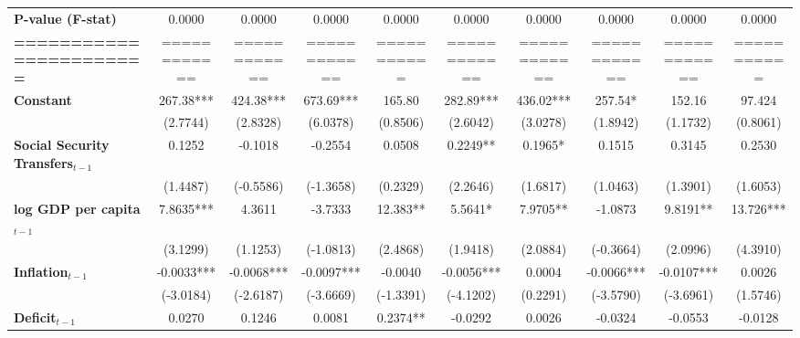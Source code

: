 \begin{center}
\begin{tabular}{lccccccccc}
\textbf{P-value (F-stat)}          &     0.0000     &      0.0000      &      0.0000      &      0.0000      &      0.0000      &      0.0000      &      0.0000      &      0.0000      &      0.0000       \\
\textbf{=======================}   &  ============  &   ============   &   ============   &   ===========    &   ============   &   ============   &   ============   &   ============   &   ===========     \\
\textbf{Constant}                     &   267.38***    &    424.38***     &    673.69***     &      165.80      &    282.89***     &    436.02***     &     257.54*      &      152.16      &      97.424       \\
\textbf{ }                         &    (2.7744)    &     (2.8328)     &     (6.0378)     &     (0.8506)     &     (2.6042)     &     (3.0278)     &     (1.8942)     &     (1.1732)     &     (0.8061)      \\
\textbf{Social Security Transfers$_{t-1}$}              &     0.1252     &     -0.1018      &     -0.2554      &      0.0508      &     0.2249**     &     0.1965*      &      0.1515      &      0.3145      &      0.2530       \\
\textbf{ }                         &    (1.4487)    &    (-0.5586)     &    (-1.3658)     &     (0.2329)     &     (2.2646)     &     (1.6817)     &     (1.0463)     &     (1.3901)     &     (1.6053)      \\
\textbf{log GDP per capita$_{t-1}$}           &   7.8635***    &      4.3611      &     -3.7333      &     12.383**     &     5.5641*      &     7.9705**     &     -1.0873      &     9.8191**     &    13.726***      \\
\textbf{ }                         &    (3.1299)    &     (1.1253)     &    (-1.0813)     &     (2.4868)     &     (1.9418)     &     (2.0884)     &    (-0.3664)     &     (2.0996)     &     (4.3910)      \\
\textbf{Inflation$_{t-1}$}      &   -0.0033***   &    -0.0068***    &    -0.0097***    &     -0.0040      &    -0.0056***    &      0.0004      &    -0.0066***    &    -0.0107***    &      0.0026       \\
\textbf{ }                         &   (-3.0184)    &    (-2.6187)     &    (-3.6669)     &    (-1.3391)     &    (-4.1202)     &     (0.2291)     &    (-3.5790)     &    (-3.6961)     &     (1.5746)      \\
\textbf{Deficit$_{t-1}$}             &     0.0270     &      0.1246      &      0.0081      &     0.2374**     &     -0.0292      &      0.0026      &     -0.0324      &     -0.0553      &     -0.0128       \\

\end{tabular}
\end{center}
